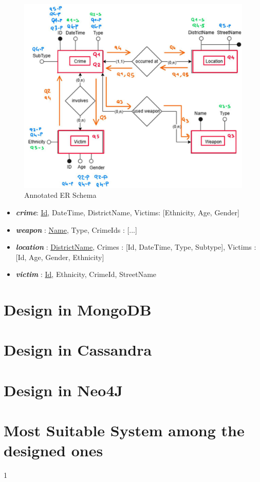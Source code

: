 \begin{figure}
    \centering
    \includegraphics[width=0.8\linewidth]{annotated_schema.jpg}
    \caption{Annotated ER Schema}
    \label{fig:enter-label}
\end{figure}

\begin{itemize}
    \item \textbf{\textit{crime}}: {\underline{Id}, DateTime, DistrictName, Victims: [{Ethnicity, Age, Gender}]}
    \item \textbf{\textit{weapon}} : {\underline{Name}, Type, CrimeIds : [...]}
    \item \textbf{\textit{location}} : {\underline{DistrictName}, Crimes : [{Id, DateTime, Type, Subtype}], Victims : [{Id, Age, Gender, Ethnicity}]}
    \item \textbf{\textit{victim}} : {\underline{Id}, Ethnicity, CrimeId, StreetName}
\end{itemize}

\section{Design in MongoDB}
\section{Design in Cassandra}
\section{Design in Neo4J}
\section{Most Suitable System among the designed ones}


1